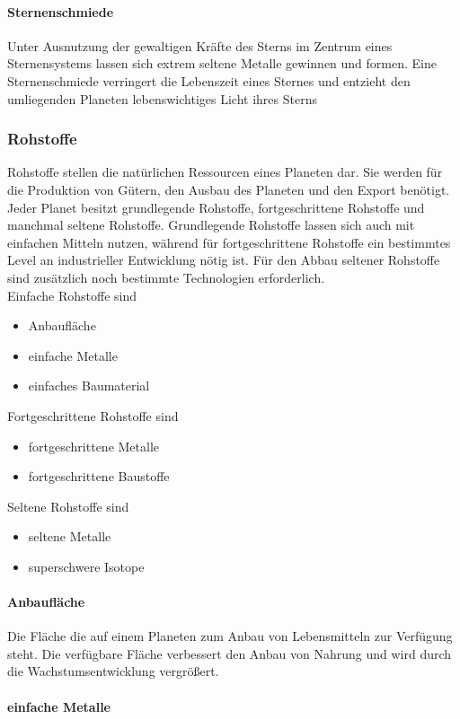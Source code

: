 \documentclass[11pt, a4paper]{article}
\begin{document}
\paragraph{Sternenschmiede}
Unter Ausnutzung der gewaltigen Kräfte des Sterns im Zentrum eines Sternensystems lassen sich extrem seltene
Metalle gewinnen und formen. Eine Sternenschmiede verringert die Lebenszeit eines Sternes und entzieht den
umliegenden Planeten lebenswichtiges Licht ihres Sterns
%
\subsubsection{Rohstoffe}
Rohstoffe stellen die natürlichen Ressourcen eines Planeten dar. Sie werden für die Produktion von Gütern,
den Ausbau des Planeten und den Export benötigt. Jeder Planet besitzt grundlegende Rohstoffe, fortgeschrittene
Rohstoffe und manchmal seltene Rohstoffe. Grundlegende Rohstoffe lassen sich auch mit einfachen Mitteln
nutzen, während für fortgeschrittene Rohstoffe ein bestimmtes Level an industrieller Entwicklung nötig ist.
Für den Abbau seltener Rohstoffe sind zusätzlich noch bestimmte Technologien erforderlich.
\\
Einfache Rohstoffe sind
\begin{itemize}
	\item Anbaufläche
	\item einfache Metalle
	\item einfaches Baumaterial
\end{itemize}
%
Fortgeschrittene Rohstoffe sind
\begin{itemize}
	\item fortgeschrittene Metalle
	\item fortgeschrittene Baustoffe
\end{itemize}
%
Seltene Rohstoffe sind
\begin{itemize}
	\item seltene Metalle
	\item superschwere Isotope
\end{itemize}
%
\paragraph{Anbaufläche}
Die Fläche die auf einem Planeten zum Anbau von Lebensmitteln zur Verfügung steht. Die verfügbare Fläche
verbessert den Anbau von Nahrung und wird durch die Wachstumsentwicklung vergrößert.
%
\paragraph{einfache Metalle}
%
\end{document}
